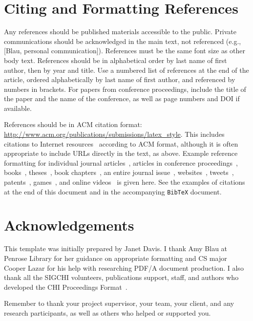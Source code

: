 \documentclass{article}
\begin{document}
\section{Citing and Formatting References}

Any references should be published materials accessible to the
public. Private communications
should be acknowledged in the main text, not referenced (e.g.,
[Blau, personal communication]). References must be the same
font size as other body text. References should be in alphabetical
order by last name of first author, then by year and title. Use a numbered list of references
at the end of the article, ordered alphabetically by last name of
first author, and referenced by numbers in brackets. For papers from
conference proceedings, include the title of the paper and the name of
the conference, as well as page numbers and DOI if available.

References should be in ACM citation format:
\url{http://www.acm.org/publications/submissions/latex_style}.  This
includes citations to Internet
resources~\cite{cavender:writing,CHI,CHINOSAUR:venue,psy:gangnam}
according to ACM format, although it is often appropriate to include
URLs directly in the text, as above. Example reference formatting for
individual journal articles~\cite{ethics}, articles in conference
proceedings~\cite{Klemmer:2002:WSC:503376.503378},
books~\cite{Schwartz:1995:GBF}, theses~\cite{sutherland:sketchpad},
book chapters~\cite{winner:politics}, an entire journal
issue~\cite{kaye:puc},
websites~\cite{acm_categories,cavender:writing},
tweets~\cite{CHINOSAUR:venue}, patents~\cite{heilig:sensorama}, 
games~\cite{supermetroid:snes}, and
online videos~\cite{psy:gangnam} is given here.  See the examples of
citations at the end of this document and in the accompanying
\texttt{BibTeX} document.

\section{Acknowledgements}
This template was initially prepared by Janet Davis.
I thank Amy Blau at Penrose Library for her guidance on appropriate formatting and  CS major Cooper Lazar for his help with researching PDF/A document production. I also thank all the SIGCHI volunteers, publications support, staff, and authors
who developed the CHI Proceedings Format~\cite{CHI}. 

Remember to thank your project supervisor, your team, your client, and any research participants, as well as others who helped or supported you.

\printbibliography
\end{document}
